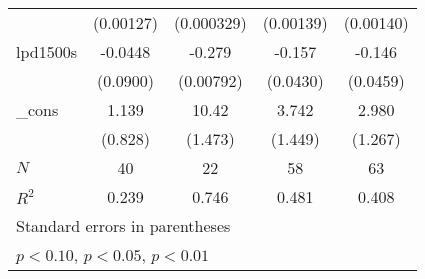 {\begin{tabular}{l*{4}{c}}
            &   (0.00127)         &  (0.000329)         &   (0.00139)         &   (0.00140)         \\
[1em]
lpd1500s    &     -0.0448         &      -0.279\sym{***}&      -0.157\sym{**} &      -0.146\sym{**} \\
            &    (0.0900)         &   (0.00792)         &    (0.0430)         &    (0.0459)         \\
[1em]
\_cons      &       1.139         &       10.42\sym{***}&       3.742\sym{**} &       2.980\sym{*}  \\
            &     (0.828)         &     (1.473)         &     (1.449)         &     (1.267)         \\
\hline
\(N\)       &          40         &          22         &          58         &          63         \\
\(R^{2}\)   &       0.239         &       0.746         &       0.481         &       0.408         \\
\hline\hline
\multicolumn{5}{l}{\footnotesize Standard errors in parentheses}\\
\multicolumn{5}{l}{\footnotesize \sym{*} \(p<0.10\), \sym{**} \(p<0.05\), \sym{***} \(p<0.01\)}\\
\end{tabular}
}
